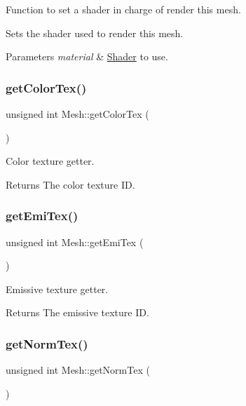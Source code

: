 Function to set a shader in charge of render this mesh. 

Sets the shader used to render this mesh.


\begin{DoxyParams}{Parameters}
{\em material} & \hyperlink{class_shader}{Shader} to use. \\
\hline
\end{DoxyParams}
\mbox{\label{class_mesh_a838bd5498ec781707bb28830ff5e064d}} 
\subsubsection{\texorpdfstring{get\+Color\+Tex()}{getColorTex()}}
{\footnotesize\ttfamily unsigned int Mesh\+::get\+Color\+Tex (\begin{DoxyParamCaption}{ }\end{DoxyParamCaption})}



Color texture getter. 

\begin{DoxyReturn}{Returns}
The color texture ID. 
\end{DoxyReturn}
\mbox{\label{class_mesh_ad0b8c57f20a5319e2e730cfa61271904}} 
\subsubsection{\texorpdfstring{get\+Emi\+Tex()}{getEmiTex()}}
{\footnotesize\ttfamily unsigned int Mesh\+::get\+Emi\+Tex (\begin{DoxyParamCaption}{ }\end{DoxyParamCaption})}



Emissive texture getter. 

\begin{DoxyReturn}{Returns}
The emissive texture ID. 
\end{DoxyReturn}
\mbox{\label{class_mesh_a8b60518f329c4e3d15824ef68c794fa1}} 
\subsubsection{\texorpdfstring{get\+Norm\+Tex()}{getNormTex()}}
{\footnotesize\ttfamily unsigned int Mesh\+::get\+Norm\+Tex (\begin{DoxyParamCaption}{ }\end{DoxyParamCaption})}



